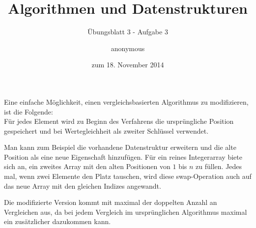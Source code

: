 \documentclass[a4paper]{scrartcl}
\title{Algorithmen und Datenstrukturen}
\subtitle{Übungsblatt 3 - Aufgabe 3}
\author{
    anonymous
}
\date{zum 18. November 2014}
\begin{document}
\maketitle

Eine einfache Möglichkeit, einen vergleichsbasierten Algorithmus zu
modifizieren, ist die Folgende: \\
Für jedes Element wird zu Beginn des Verfahrens die ursprüngliche Position
gespeichert und bei Wertegleichheit als zweiter Schlüssel verwendet.

Man kann zum Beispiel die vorhandene Datenstruktur erweitern und die alte
Position als eine neue Eigenschaft hinzufügen.
Für ein reines Integerarray biete sich an, ein zweites Array mit den alten
Positionen von $1$ bis $n$ zu füllen.
Jedes mal, wenn zwei Elemente den Platz tauschen, wird diese swap-Operation
auch auf das neue Array mit den gleichen Indizes angewandt.

Die modifizierte Version kommt mit maximal der doppelten Anzahl an Vergleichen
aus, da bei jedem Vergleich im ursprünglichen Algorithmus maximal ein
zusätzlicher dazukommen kann.
\end{document}
